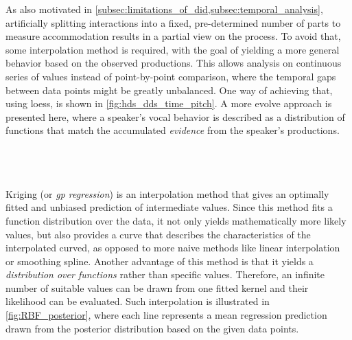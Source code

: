 As also motivated in \cref{subsec:limitations_of_did,subsec:temporal_analysis}, artificially splitting interactions into a fixed, pre-determined number of parts to measure accommodation results in a partial view on the process.
To avoid that, some interpolation method is required, with the goal of yielding a more general behavior based on the observed productions.
This allows analysis on continuous series of values instead of point-by-point comparison, where the temporal gaps between data points might be greatly unbalanced.
One way of achieving that, using \ac{loess}, is shown in \cref{fig:hds_dds_time_pitch}.
A more evolve approach is presented here, where a speaker's vocal behavior is described as a distribution of functions that match the accumulated \textit{evidence} from the speaker's productions.

\citet{Galvez2020unifiying}\\ %
\citet{Kousidis2008towards}\\ %
\citet{Kousidis2009monitoring}\\ %

Kriging (or \textit{\acl{gp} regression}) is an interpolation method that gives an optimally fitted and unbiased prediction of intermediate values.
Since this method fits a function distribution over the data, it not only yields mathematically more likely values, but also provides a curve that describes the characteristics of the interpolated curved, as opposed to more naive methods like linear interpolation or smoothing spline.
Another advantage of this method is that it yields a \textit{distribution over functions} rather than specific values.
Therefore, an infinite number of suitable values can be drawn from one fitted kernel and their likelihood can be evaluated.
Such interpolation is illustrated in \cref{fig:RBF_posterior}, where each line represents a mean regression prediction drawn from the posterior distribution based on the given data points.

